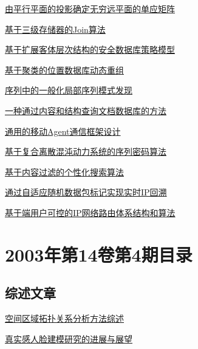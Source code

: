 \documentclass[a4paper]{article}
\begin{document}
\href{http://www.jos.org.cn/ch/reader/download_pdf.aspx?file_no=20030511&year_id=2003&quarter_id=5&falg=1}{由平行平面的投影确定无穷远平面的单应矩阵}

\href{http://www.jos.org.cn/ch/reader/download_pdf.aspx?file_no=20030512&year_id=2003&quarter_id=5&falg=1}{基于三级存储器的Join算法}

\href{http://www.jos.org.cn/ch/reader/download_pdf.aspx?file_no=20030513&year_id=2003&quarter_id=5&falg=1}{基于扩展客体层次结构的安全数据库策略模型}

\href{http://www.jos.org.cn/ch/reader/download_pdf.aspx?file_no=20030514&year_id=2003&quarter_id=5&falg=1}{基于聚类的位置数据库动态重组}

\href{http://www.jos.org.cn/ch/reader/download_pdf.aspx?file_no=20030515&year_id=2003&quarter_id=5&falg=1}{序列中的一般化局部序列模式发现}

\href{http://www.jos.org.cn/ch/reader/download_pdf.aspx?file_no=20030516&year_id=2003&quarter_id=5&falg=1}{一种通过内容和结构查询文档数据库的方法}

\href{http://www.jos.org.cn/ch/reader/download_pdf.aspx?file_no=20030517&year_id=2003&quarter_id=5&falg=1}{通用的移动Agent通信框架设计}

\href{http://www.jos.org.cn/ch/reader/download_pdf.aspx?file_no=20030518&year_id=2003&quarter_id=5&falg=1}{基于复合离散混沌动力系统的序列密码算法}

\href{http://www.jos.org.cn/ch/reader/download_pdf.aspx?file_no=20030519&year_id=2003&quarter_id=5&falg=1}{基于内容过滤的个性化搜索算法}

\href{http://www.jos.org.cn/ch/reader/download_pdf.aspx?file_no=20030520&year_id=2003&quarter_id=5&falg=1}{通过自适应随机数据包标记实现实时IP回溯}

\href{http://www.jos.org.cn/ch/reader/download_pdf.aspx?file_no=20030522&year_id=2003&quarter_id=5&falg=1}{基于端用户可控的IP网络路由体系结构和算法}


\section{\textbf{2003年第14卷第4期目录}}
\subsection{综述文章}
\href{http://www.jos.org.cn/ch/reader/download_pdf.aspx?file_no=20030409&year_id=2003&quarter_id=4&falg=1}{空间区域拓扑关系分析方法综述}

\href{http://www.jos.org.cn/ch/reader/download_pdf.aspx?file_no=20030413&year_id=2003&quarter_id=4&falg=1}{真实感人脸建模研究的进展与展望}
\end{document}
